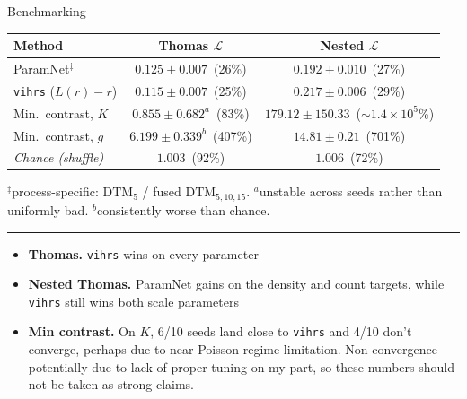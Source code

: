 \documentclass[aspectratio=169,10pt]{beamer}
\newcommand{\Loss}{\mathcal{L}}
\newcommand{\DTM}{\mathrm{DTM}}
\begin{document}
\begin{frame}{Benchmarking}
\centering\footnotesize
\begin{tabular}{lcc}
\toprule
Method & Thomas $\Loss$ & Nested $\Loss$ \\
\midrule
ParamNet$^{\ddagger}$     & $0.125 \pm 0.007$~{\scriptsize(26\%)}      & $\mathbf{0.192 \pm 0.010}$~{\scriptsize(27\%)} \\
\texttt{vihrs} ($L(r)-r$) & $\mathbf{0.115 \pm 0.007}$~{\scriptsize(25\%)} & $0.217 \pm 0.006$~{\scriptsize(29\%)} \\
Min.\ contrast, $K$       & $0.855 \pm 0.682^{a}$~{\scriptsize(83\%)}  & $179.12 \pm 150.33$~{\scriptsize($\sim\!1.4{\times}10^{5}$\%)} \\
Min.\ contrast, $g$       & $6.199 \pm 0.339^{b}$~{\scriptsize(407\%)} & $14.81 \pm 0.21$~{\scriptsize(701\%)} \\
\midrule
\emph{Chance (shuffle)}   & \emph{$1.003$}~{\scriptsize(92\%)}         & \emph{$1.006$}~{\scriptsize(72\%)} \\
\bottomrule
\end{tabular}

\vspace{4pt}
{\raggedright\scriptsize
$^{\ddagger}$process-specific: $\DTM_5$ / fused $\DTM_{5,10,15}$.
$^{a}$unstable across seeds rather than uniformly bad.
$^{b}$consistently worse than chance.\par}

\vspace{8pt}
\hrule
\vspace{5pt}

{\footnotesize
\begin{itemize}\setlength\itemsep{1pt}
  \item \textbf{Thomas.} \texttt{vihrs} wins on every parameter
    \item \textbf{Nested Thomas.} ParamNet gains on the density and count targets, while
\texttt{vihrs} still wins both scale parameters
    \item \textbf{Min contrast.} On $K$, 6/10 seeds
land close to \texttt{vihrs} and 4/10 don't converge, perhaps due to near-Poisson regime limitation. Non-convergence potentially due to lack of proper tuning on my part, so these numbers should not be taken as strong claims.
\end{itemize}}
\end{frame}
\end{document}
